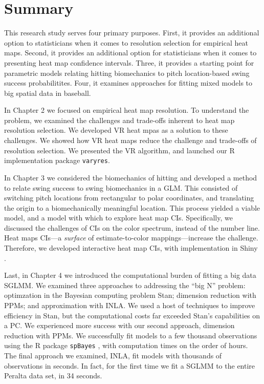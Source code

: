 \section{Summary} %

This research study serves four primary purposes. First, it provides an additional option to statisticians when it comes to resolution selection for empirical heat maps. Second, it provides an additional option for statisticians when it comes to presenting heat map confidence intervals. Three, it provides a starting point for parametric models relating  hitting biomechanics to pitch location-based swing success probabilitites. Four, it examines approaches for fitting mixed models to big spatial data in baseball.  

In Chapter 2 we focused on empirical heat map resolution. To understand the problem, we examined the challenges and trade-offs inherent to heat map resolution selection. We developed VR heat mpas as a solution to these challenges. We showed how VR heat maps reduce the challenge and trade-offs of resolution selection. We presented the VR algorithm, and launched our R implementation package \verb|varyres|.

In Chapter 3 we considered the biomechanics of hitting and developed a method to relate swing success to swing biomechanics in a GLM. This consisted of switching pitch locations from rectangular to polar coordinates, and translating the origin to a biomechanically meaningful location. This process yielded a viable model, and a model with which to explore heat map CIs. Specifically, we discussed the challenges of CIs on the color spectrum, instead of the number line. Heat maps CIs---a {\it surface} of estimate-to-color mappings---increase the challenge. Therefore, we developed interactive heat map CIs, with implementation in Shiny \citep{Shiny}.

Last, in Chapter 4 we introduced the computational burden of fitting a big data SGLMM. We examined three approaches to addressing the ``big N'' problem: optimzation in the Bayesian computing problem Stan; dimension reduction with PPMs; and approximation with INLA. We used a host of techniques to improve efficiency in Stan, but the computational costs far exceeded Stan's capabilities on a PC. We experienced more success with our second approach, dimension reduction with PPMs. We successfully fit models to a few thousand observations using the R package \verb|spBayes| \citep{Finley2013}, with computation times on the order of hours. The final approach we examined, INLA, fit models with thousands of observations in seconds. In fact, for the first time we fit a SGLMM to the entire Peralta data set, in 34 seconds.

